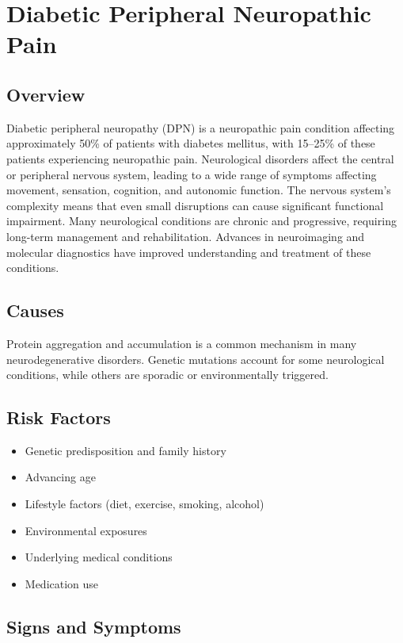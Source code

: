 \chapter{Diabetic Peripheral Neuropathic Pain}
\label{sec:Diabetic Peripheral Neuropathic Pain}

\section{Overview}
Diabetic peripheral neuropathy (DPN) is a neuropathic pain condition affecting approximately 50\% of patients with diabetes mellitus, with 15--25\% of these patients experiencing neuropathic pain. Neurological disorders affect the central or peripheral nervous system, leading to a wide range of symptoms affecting movement, sensation, cognition, and autonomic function. The nervous system's complexity means that even small disruptions can cause significant functional impairment. Many neurological conditions are chronic and progressive, requiring long-term management and rehabilitation. Advances in neuroimaging and molecular diagnostics have improved understanding and treatment of these conditions.
\section{Causes}
Protein aggregation and accumulation is a common mechanism in many neurodegenerative disorders.  Genetic mutations account for some neurological conditions, while others are sporadic or environmentally triggered.   
\section{Risk Factors}
\begin{itemize}[noitemsep]
  \item Genetic predisposition and family history
  \item Advancing age
  \item Lifestyle factors (diet, exercise, smoking, alcohol)
  \item Environmental exposures
  \item Underlying medical conditions
  \item Medication use
\end{itemize}
\section{Signs and Symptoms}
